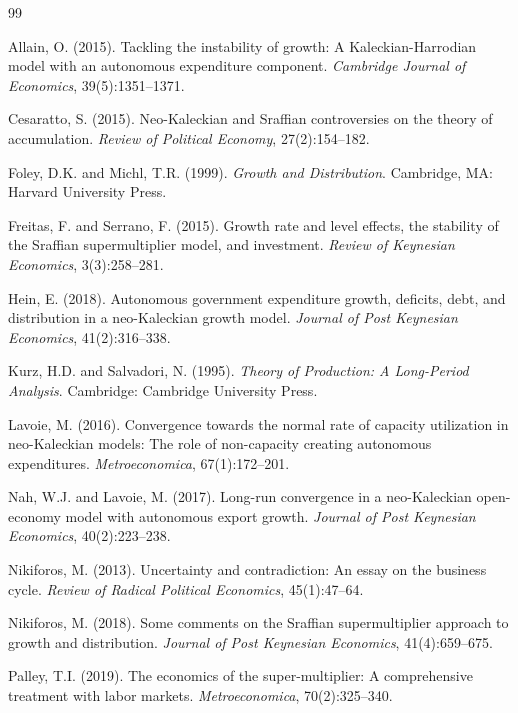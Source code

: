 \documentclass[12pt, a4paper]{article}
\theoremstyle{definition}
\theoremstyle{remark}
\begin{document}
\begin{thebibliography}{99}

Allain, O. (2015). Tackling the instability of growth: A Kaleckian-Harrodian model with an autonomous expenditure component. \emph{Cambridge Journal of Economics}, 39(5):1351--1371.

Cesaratto, S. (2015). Neo-Kaleckian and Sraffian controversies on the theory of accumulation. \emph{Review of Political Economy}, 27(2):154--182.

Foley, D.K. and Michl, T.R. (1999). \emph{Growth and Distribution}. Cambridge, MA: Harvard University Press.

Freitas, F. and Serrano, F. (2015). Growth rate and level effects, the stability of the Sraffian supermultiplier model, and investment. \emph{Review of Keynesian Economics}, 3(3):258--281.

Hein, E. (2018). Autonomous government expenditure growth, deficits, debt, and distribution in a neo-Kaleckian growth model. \emph{Journal of Post Keynesian Economics}, 41(2):316--338.

Kurz, H.D. and Salvadori, N. (1995). \emph{Theory of Production: A Long-Period Analysis}. Cambridge: Cambridge University Press.

Lavoie, M. (2016). Convergence towards the normal rate of capacity utilization in neo-Kaleckian models: The role of non-capacity creating autonomous expenditures. \emph{Metroeconomica}, 67(1):172--201.

Nah, W.J. and Lavoie, M. (2017). Long-run convergence in a neo-Kaleckian open-economy model with autonomous export growth. \emph{Journal of Post Keynesian Economics}, 40(2):223--238.

Nikiforos, M. (2013). Uncertainty and contradiction: An essay on the business cycle. \emph{Review of Radical Political Economics}, 45(1):47--64.

Nikiforos, M. (2018). Some comments on the Sraffian supermultiplier approach to growth and distribution. \emph{Journal of Post Keynesian Economics}, 41(4):659--675.

Palley, T.I. (2019). The economics of the super-multiplier: A comprehensive treatment with labor markets. \emph{Metroeconomica}, 70(2):325--340.


\end{thebibliography}
\end{document}
